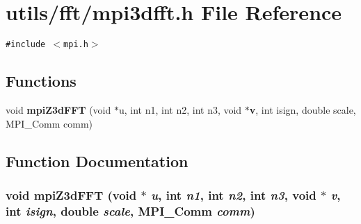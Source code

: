 \section{utils/fft/mpi3dfft.h File Reference}
\label{mpi3dfft_8h}
{\tt \#include $<$mpi.h$>$}\par
\subsection*{Functions}
\begin{CompactItemize}
\item 
void {\bf mpi\-Z3d\-FFT} (void $\ast$u, int n1, int n2, int n3, void $\ast${\bf v}, int isign, double scale, MPI\_\-Comm comm)
\end{CompactItemize}


\subsection{Function Documentation}
\subsubsection{\setlength{\rightskip}{0pt plus 5cm}void mpi\-Z3d\-FFT (void $\ast$ {\em u}, int {\em n1}, int {\em n2}, int {\em n3}, void $\ast$ {\em v}, int {\em isign}, double {\em scale}, MPI\_\-Comm {\em comm})}\label{mpi3dfft_8h_0e65b820b0862f5165be8457a6f8e632}


